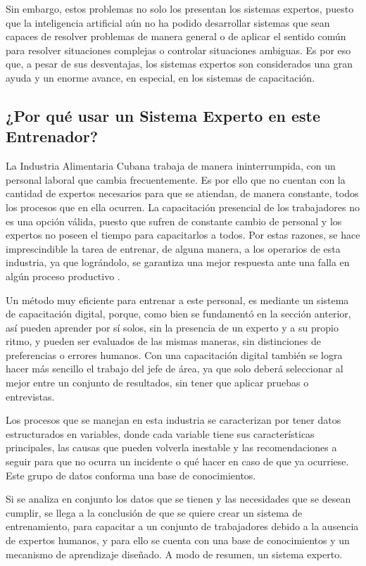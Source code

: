 Sin embargo, estos problemas no solo los presentan los sistemas expertos, puesto que la inteligencia artificial aún no ha podido desarrollar sistemas que
sean capaces de resolver problemas de manera general o de aplicar el sentido común para resolver situaciones complejas o controlar situaciones ambiguas. Es por eso que, a pesar de sus desventajas, los sistemas expertos son considerados una gran ayuda y un enorme avance, en especial, en los sistemas de capacitación.

\subsection{¿Por qué usar un Sistema Experto en este Entrenador?}
La Industria Alimentaria Cubana trabaja de manera ininterrumpida, con un personal laboral que cambia frecuentemente. Es por ello que no cuentan con la cantidad de expertos necesarios para que se atiendan, de manera constante, todos los procesos que en ella ocurren. La capacitación presencial de los trabajadores no es una opción válida, puesto que sufren de constante cambio de personal y los expertos no poseen el tiempo para capacitarlos a todos. Por estas razones, se hace imprescindible la tarea de entrenar, de alguna manera, a los operarios de esta industria, ya que lográndolo, se garantiza una mejor respuesta ante una falla en algún proceso productivo \cite{gestorBases}.

Un método muy eficiente para entrenar a este personal, es mediante un sistema de capacitación digital, porque, como bien se fundamentó en la sección anterior, así pueden aprender por sí solos, sin la presencia de un experto y a su propio ritmo, y pueden ser evaluados de las mismas maneras, sin distinciones de preferencias o errores humanos. Con una capacitación digital también se logra hacer más sencillo el trabajo del jefe de área, ya que solo deberá seleccionar al mejor entre un conjunto de resultados, sin tener que aplicar pruebas o entrevistas.

Los procesos que se manejan en esta industria se caracterizan por tener datos estructurados en variables, donde cada variable tiene sus características principales, las causas que pueden volverla inestable y las recomendaciones a seguir para que no ocurra un incidente o qué hacer en caso de que ya ocurriese. Este grupo de datos conforma una base de conocimientos.

Si se analiza en conjunto los datos que se tienen y las necesidades que se desean cumplir, se llega a la conclusión de que se quiere crear un sistema de entrenamiento, para capacitar a un conjunto de trabajadores debido a la ausencia de expertos humanos, y para ello se cuenta con una base de conocimientos y un mecanismo de aprendizaje diseñado. A modo de resumen, un sistema experto.

